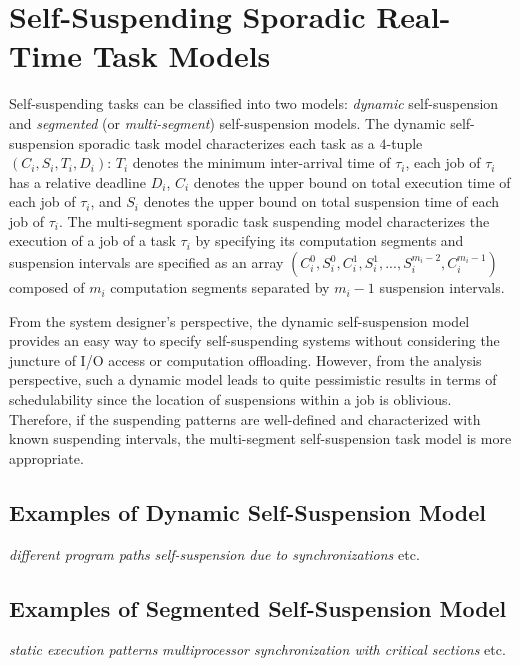 \section{Self-Suspending Sporadic Real-Time Task Models}
  
Self-suspending tasks can be classified into two models: \emph{dynamic} self-suspension and \emph{segmented} (or \emph{multi-segment}) self-suspension models. 
The dynamic self-suspension sporadic task model characterizes each task as a $4$-tuple $(C_i,S_i,T_i,D_i)$: $T_i$ denotes the minimum inter-arrival time of $\tau_i$, each job of $\tau_i$ has a relative deadline $D_i$,
$C_i$ denotes the upper bound on total execution time of each job of $\tau_i$,
and $S_i$ denotes the upper bound on total suspension time of each job of $\tau_i$. The multi-segment sporadic task suspending model characterizes the execution of a job of a task $\tau_i$ by  specifying its computation segments and suspension intervals are specified as an array
$(C_{i}^0,S_{i}^0,C_{i}^1,S_{i}^1,...,S_{i}^{m_i-2},C_{i}^{m_i-1})$ composed of $m_i$ computation segments separated by $m_i-1$ suspension intervals. 

From the system designer's perspective, the dynamic self-suspension model provides an easy way to specify self-suspending systems without considering the juncture of I/O access or computation offloading. 
However, from the analysis perspective, such a  dynamic model leads to quite pessimistic results in terms of schedulability since the location of suspensions within a job is oblivious. Therefore, if the suspending patterns are well-defined and characterized with known suspending intervals, the multi-segment self-suspension task model is more appropriate.   

\subsection{Examples of Dynamic Self-Suspension Model} 
  \textit{different program paths}
  \textit{self-suspension due to synchronizations}
  etc.
  
\subsection{Examples of Segmented Self-Suspension Model} 
  \textit{static execution patterns}
  \textit{multiprocessor synchronization with critical sections}
  etc.
  
  